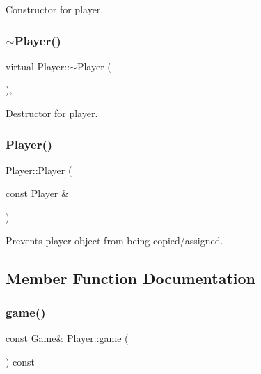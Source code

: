 Constructor for player. 

\mbox{\label{class_player_a8981c201ffb2270c0b6dbd467b627376}} 
\subsubsection{\texorpdfstring{$\sim$\+Player()}{~Player()}}
{\footnotesize\ttfamily virtual Player\+::$\sim$\+Player (\begin{DoxyParamCaption}{ }\end{DoxyParamCaption})\hspace{0.3cm}{\ttfamily [inline]}, {\ttfamily [virtual]}}



Destructor for player. 

\mbox{\label{class_player_ae8015d1f08ba69d663cfdaea1a64d1a4}} 
\subsubsection{\texorpdfstring{Player()}{Player()}\hspace{0.1cm}{\footnotesize\ttfamily [2/2]}}
{\footnotesize\ttfamily Player\+::\+Player (\begin{DoxyParamCaption}\item[{const \mbox{\hyperlink{class_player}{Player}} \&}]{ }\end{DoxyParamCaption})\hspace{0.3cm}{\ttfamily [delete]}}



Prevents player object from being copied/assigned. 



\subsection{Member Function Documentation}
\mbox{\label{class_player_ab4ef841709083fe60f6647ce0a7ca816}} 
\subsubsection{\texorpdfstring{game()}{game()}}
{\footnotesize\ttfamily const \mbox{\hyperlink{class_game}{Game}}\& Player\+::game (\begin{DoxyParamCaption}{ }\end{DoxyParamCaption}) const\hspace{0.3cm}{\ttfamily [inline]}}



